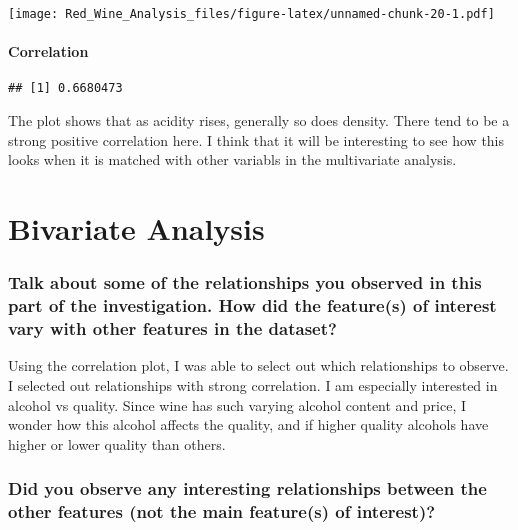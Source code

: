 \documentclass[]{article}
\let\oldparagraph\paragraph
\renewcommand{\paragraph}[1]{\oldparagraph{#1}\mbox{}}
\begin{document}
\texttt{[image: Red\_Wine\_Analysis\_files/figure-latex/unnamed-chunk-20-1.pdf]}

\hypertarget{correlation-1}{%
\paragraph{Correlation}\label{correlation-1}}

\begin{verbatim}
## [1] 0.6680473
\end{verbatim}

The plot shows that as acidity rises, generally so does density. There
tend to be a strong positive correlation here. I think that it will be
interesting to see how this looks when it is matched with other variabls
in the multivariate analysis.

\hypertarget{bivariate-analysis}{%
\section{Bivariate Analysis}\label{bivariate-analysis}}

\hypertarget{talk-about-some-of-the-relationships-you-observed-in-this-part-of-the-investigation.-how-did-the-features-of-interest-vary-with-other-features-in-the-dataset}{%
\subsubsection{Talk about some of the relationships you observed in this
part of the investigation. How did the feature(s) of interest vary with
other features in the
dataset?}\label{talk-about-some-of-the-relationships-you-observed-in-this-part-of-the-investigation.-how-did-the-features-of-interest-vary-with-other-features-in-the-dataset}}

Using the correlation plot, I was able to select out which relationships
to observe. I selected out relationships with strong correlation. I am
especially interested in alcohol vs quality. Since wine has such varying
alcohol content and price, I wonder how this alcohol affects the
quality, and if higher quality alcohols have higher or lower quality
than others.

\hypertarget{did-you-observe-any-interesting-relationships-between-the-other-features-not-the-main-features-of-interest}{%
\subsubsection{Did you observe any interesting relationships between the
other features (not the main feature(s) of
interest)?}\label{did-you-observe-any-interesting-relationships-between-the-other-features-not-the-main-features-of-interest}}
\end{document}
